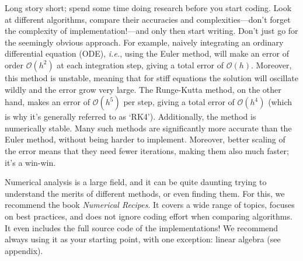 \documentclass[openany,oneside]{report}
\begin{document}
Long story short; spend some time doing research before you start coding.
Look at different algorithms, compare their accuracies and complexities---don't forget the complexity of implementation!---and only then start writing.
Don't just go for the seemingly obvious approach.
For example, naively integrating an ordinary differential equation (ODE), \emph{i.e.}, using the Euler method, will make an error of order $\mathcal{O}\left(h^2\right)$ at each integration step, giving a total error of $\mathcal{O}(h)$.
Moreover, this method is unstable, meaning that for stiff equations the solution will oscillate wildly and the error grow very large.
The Runge-Kutta method, on the other hand, makes an error of $\mathcal{O}\left(h^5\right)$ per step, giving a total error of $\mathcal{O}\left(h^4\right)$ (which is why it's generally referred to as `RK4').
Additionally, the method is numerically stable.
Many such methods are significantly more accurate than the Euler method, without being harder to implement.
Moreover, better scaling of the error means that they need fewer iterations, making them also much faster; it's a win-win.

Numerical analysis is a large field, and it can be quite daunting trying to understand the merits of different methods, or even finding them.
For this, we recommend the book \emph{Numerical Recipes}.
It covers a wide range of topics, focuses on best practices, and does not ignore coding effort when comparing algorithms.
It even includes the full source code of the implementations! We recommend always using it as your starting point, with one exception: linear algebra (see appendix).
\end{document}
